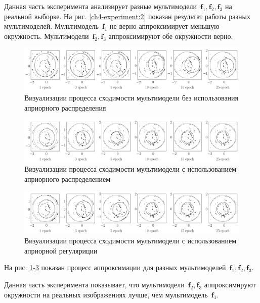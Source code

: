 Данная часть эксперимента анализирует разные мультимодели~$\textbf{f}_1, \textbf{f}_2, \textbf{f}_3$ на реальной выборке.
На рис. \ref{ch4-experiment:2} показан результат работы разных мультимоделей.
Мультимодель~$\textbf{f}_1$  не верно аппроксимирует меньшую окружность.
Мультимодели~$\textbf{f}_2, \textbf{f}_3$ аппроксимируют обе окружности верно.

\begin{figure}[h!t]\center
\includegraphics[width=1\textwidth]{results/priorexpert/experiment_real_not_prior}
\caption{Визуализации процесса сходимости мультимодели без использования априорного распределения}
\label{ch4-experiment:3}
\end{figure}

\begin{figure}[h!t]\center
\includegraphics[width=1\textwidth]{results/priorexpert/experiment_real_prior}
\caption{Визуализации процесса сходимости мультимодели с использованием априорного распределением}
\label{ch4-experiment:4}
\end{figure}

\begin{figure}[h!t]\center
\includegraphics[width=1\textwidth]{results/priorexpert/experiment_real_regular}
\caption{Визуализации процесса сходимости мультимодели с использованием априорной регуляриции}
\label{ch4-experiment:5}
\end{figure}

На рис. \ref{ch4-experiment:3}-\ref{ch4-experiment:5} показан процесс аппроксимации для разных мультимоделей~$\textbf{f}_1, \textbf{f}_2, \textbf{f}_3$.

Данная часть эксперимента показывает, что мультимодели~$\textbf{f}_2, \textbf{f}_3$ аппроксимируют окружности на реальных изображениях лучше, чем мультимодель~$\textbf{f}_1$.

